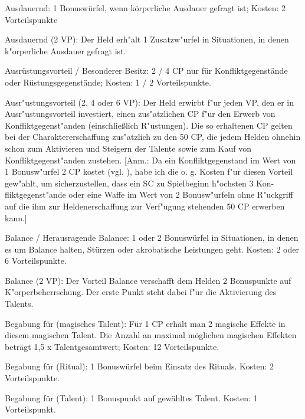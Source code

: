 \begin{description}
\item{Ausdauernd:} 1 Bonuswürfel, wenn körperliche Ausdauer gefragt ist; Kosten: 2 Vorteilspunkte

\item{Ausdauernd (2 VP):}
Der Held erh"alt 1 Zusatzw"urfel in Situationen, in denen k"orperliche Ausdauer gefragt ist.

\item{Ausrüstungsvorteil / Besonderer Besitz:} 2 / 4 CP nur für Konfliktgegenstände oder Rüstungsgegenstände; Kosten: 1 / 2 Vorteilspunkte.

\item{Ausr"ustungsvorteil (2, 4 oder 6 VP):}
Der Held erwirbt f"ur jeden VP, den er in Ausr"ustungsvorteil investiert, einen zus"atzlichen CP f"ur den Erwerb von Konfliktgegenst"anden (einschließlich R"ustungen). Die so erhaltenen CP gelten bei der Charaktererschaffung zus"atzlich zu den 50 CP, die jedem Helden ohnehin schon zum Aktivieren und Steigern der Talente sowie zum Kauf von Konfliktgegenst"anden zustehen.
[Anm.: Da ein Konfliktgegenstand im Wert von 1 Bonusw"urfel 2 CP kostet (vgl. ), habe ich die o. g. Kosten f"ur diesen Vorteil gew"ahlt, um sicherzustellen, dass ein SC zu Spielbeginn h"ochsten 3 Kon- fliktgegenst"ande oder eine Waffe im Wert von 2 Bonusw"urfeln ohne R"uckgriff auf die ihm zur Heldenerschaffung zur Verf"ugung stehenden 50 CP erwerben kann.]

\item{Balance / Herausragende Balance:} 1 oder 2 Bonuswürfel in Situationen, in denen es um Balance halten, Stürzen oder akrobatische Leistungen geht. Kosten: 2 oder 6 Vorteilspunkte.

\item{Balance (2 VP):}
Der Vorteil Balance verschafft dem Helden 2 Bonuspunkte auf K"orperbeherrschung. Der erste Punkt steht dabei f"ur die Aktivierung des Talents.

\item{Begabung für (magisches Talent):} Für 1 CP erhält man 2 magische Effekte in diesem magischen Talent. Die Anzahl an maximal möglichen magischen Effekten beträgt 1,5 x Talentgesamtwert; Kosten: 12 Vorteilspunkte.

\item{Begabung für (Ritual):} 1 Bonuswürfel beim Einsatz des Rituals. Kosten: 2 Vorteilspunkte.

\item{Begabung für (Talent):} 1 Bonuspunkt auf gewähltes Talent. Kosten: 1 Vorteilspunkt.


\end{description}

